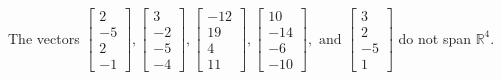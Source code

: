 \begin{exercise}
\begin{exerciseStatement}
  \end{exerciseStatement}
  \begin{exerciseAnswer}
   The vectors \(\left[\begin{array}{r}
2 \\
-5 \\
2 \\
-1
\end{array}\right] , \left[\begin{array}{r}
3 \\
-2 \\
-5 \\
-4
\end{array}\right] , \left[\begin{array}{r}
-12 \\
19 \\
4 \\
11
\end{array}\right] , \left[\begin{array}{r}
10 \\
-14 \\
-6 \\
-10
\end{array}\right] , \text{ and } \left[\begin{array}{r}
3 \\
2 \\
-5 \\
1
\end{array}\right]\) 
  	 do not  
	span \(\mathbb{R}^4\).
  


  \end{exerciseAnswer}
\end{exercise}